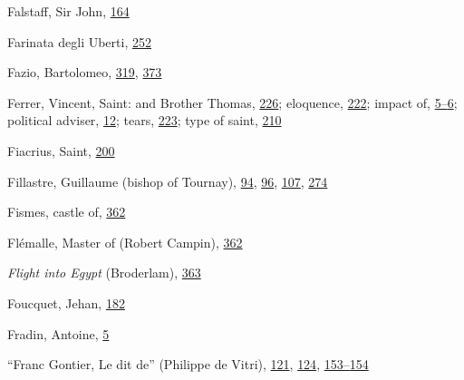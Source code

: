 Falstaff, Sir John,
\protect\hyperlink{12_Chapter_Five__THE_VISION_OF_DEAT.xhtmlux5cux23page_164}{164}

Farinata degli Uberti,
\protect\hyperlink{17_Chapter_Ten__THE_FAILURE_OF_IMAG.xhtmlux5cux23page_252}{252}

Fazio, Bartolomeo,
\protect\hyperlink{20_ILLUSTRATIONS_FOLLOW_PAGE.xhtmlux5cux23page_319}{319},
\protect\hyperlink{21_Chapter_Thirteen__IMAGE_AND_WORD.xhtmlux5cux23page_373}{373}

Ferrer, Vincent, Saint: and Brother Thomas,
\protect\hyperlink{15_Chapter_Eight__RELIGIOUS_EXCITAT.xhtmlux5cux23page_226}{226};
eloquence,
\protect\hyperlink{15_Chapter_Eight__RELIGIOUS_EXCITAT.xhtmlux5cux23page_222}{222};
impact of,
\protect\hyperlink{08_Chapter_One__THE_PASSIONATE_INTE.xhtmlux5cux23page_5}{5--}\protect\hyperlink{08_Chapter_One__THE_PASSIONATE_INTE.xhtmlux5cux23page_6}{6};
political adviser,
\protect\hyperlink{08_Chapter_One__THE_PASSIONATE_INTE.xhtmlux5cux23page_12}{12};
tears,
\protect\hyperlink{15_Chapter_Eight__RELIGIOUS_EXCITAT.xhtmlux5cux23page_223}{223};
type of saint,
\protect\hyperlink{14_Chapter_Seven__THE_PIOUS_PERSONA.xhtmlux5cux23page_210}{210}

Fiacrius, Saint,
\protect\hyperlink{13_Chapter_Six__THE_DEPICTION_OF_TH.xhtmlux5cux23page_200}{200}

Fillastre, Guillaume (bishop of Tournay),
\protect\hyperlink{10_Chapter_Three__THE_HEROIC_DREAM.xhtmlux5cux23page_94}{94},
\protect\hyperlink{10_Chapter_Three__THE_HEROIC_DREAM.xhtmlux5cux23page_96}{96},
\protect\hyperlink{10_Chapter_Three__THE_HEROIC_DREAM.xhtmlux5cux23page_107}{107},
\protect\hyperlink{18_Chapter_Eleven__THE_FORMS_OF_THO.xhtmlux5cux23page_274}{274}

Fismes, castle of,
\protect\hyperlink{21_Chapter_Thirteen__IMAGE_AND_WORD.xhtmlux5cux23page_362}{362}

Flémalle, Master of (Robert Campin),
\protect\hyperlink{21_Chapter_Thirteen__IMAGE_AND_WORD.xhtmlux5cux23page_362}{362}

\emph{Flight into Egypt} (Broderlam),
\protect\hyperlink{21_Chapter_Thirteen__IMAGE_AND_WORD.xhtmlux5cux23page_363}{363}

Foucquet, Jehan,
\protect\hyperlink{13_Chapter_Six__THE_DEPICTION_OF_TH.xhtmlux5cux23page_182}{182}

Fradin, Antoine,
\protect\hyperlink{08_Chapter_One__THE_PASSIONATE_INTE.xhtmlux5cux23page_5}{5}

``Franc Gontier, Le dit de'' (Philippe de Vitri),
\protect\hyperlink{10_Chapter_Three__THE_HEROIC_DREAM.xhtmlux5cux23page_121}{121},
\protect\hyperlink{10_Chapter_Three__THE_HEROIC_DREAM.xhtmlux5cux23page_124}{124},
\protect\hyperlink{11_Chapter_Four__THE_FORMS_OF_LOVE.xhtmlux5cux23page_153}{153--}\protect\hyperlink{11_Chapter_Four__THE_FORMS_OF_LOVE.xhtmlux5cux23page_154}{154}

